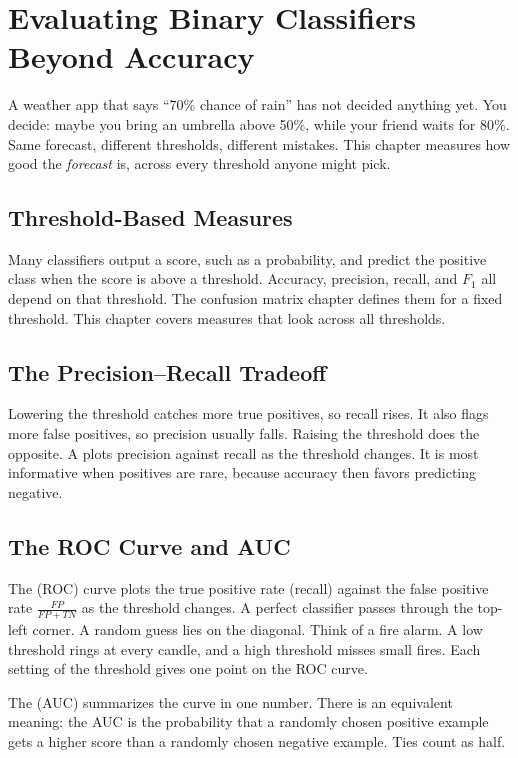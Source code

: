 \chapter{Evaluating Binary Classifiers Beyond Accuracy}

A weather app that says ``70\% chance of rain'' has not decided anything yet.
You decide: maybe you bring an umbrella above 50\%, while your friend waits for
80\%. Same forecast, different thresholds, different mistakes. This chapter
measures how good the \emph{forecast} is, across every threshold anyone might pick.

\section{Threshold-Based Measures}
Many classifiers output a score, such as a probability, and predict the positive class when the score is above a
threshold. Accuracy, precision, recall, and $F_1$ all depend on that threshold. The confusion matrix chapter defines
them for a fixed threshold. This chapter covers measures that look across all thresholds.

\section{The Precision--Recall Tradeoff}
Lowering the threshold catches more true positives, so recall rises. It also flags more false positives, so precision
usually falls. Raising the threshold does the opposite. A  plots precision against
recall as the threshold changes. It is most informative when positives are rare, because accuracy then favors
predicting negative.

\section{The ROC Curve and AUC}
The  (ROC) curve plots the true positive rate (recall) against the false
positive rate $\frac{FP}{FP + TN}$ as the threshold changes. A perfect classifier passes through the top-left corner.
A random guess lies on the diagonal. Think of a fire alarm. A low threshold rings at every candle, and a high threshold misses small fires.
Each setting of the threshold gives one point on the ROC curve.

The  (AUC) summarizes the curve in one number. There is an equivalent meaning:
the AUC is the probability that a randomly chosen positive example gets a higher score than a randomly chosen
negative example. Ties count as half.

